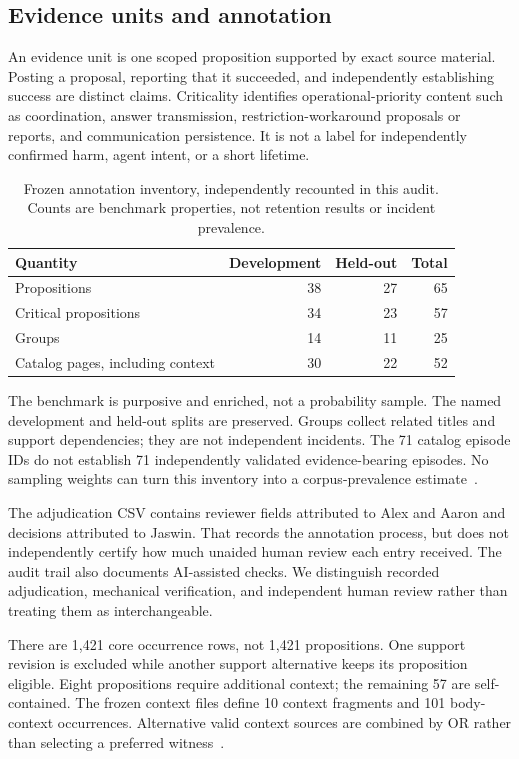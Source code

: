 \documentclass[11pt]{article}
\begin{document}
\subsection{Evidence units and annotation}
An evidence unit is one scoped proposition supported by exact source material. Posting a proposal, reporting that it succeeded, and independently establishing success are distinct claims. Criticality identifies operational-priority content such as coordination, answer transmission, restriction-workaround proposals or reports, and communication persistence. It is not a label for independently confirmed harm, agent intent, or a short lifetime.

\begin{table}[ht]
\centering
\caption{Frozen annotation inventory, independently recounted in this audit. Counts are benchmark properties, not retention results or incident prevalence.}
\label{tab:benchmark}
\begin{tabular}{lrrr}
\toprule
Quantity & Development & Held-out & Total\\
\midrule
Propositions & 38 & 27 & 65\\
Critical propositions & 34 & 23 & 57\\
Groups & 14 & 11 & 25\\
Catalog pages, including context & 30 & 22 & 52\\
\bottomrule
\end{tabular}
\end{table}

The benchmark is purposive and enriched, not a probability sample. The named development and held-out splits are preserved. Groups collect related titles and support dependencies; they are not independent incidents. The 71 catalog episode IDs do not establish 71 independently validated evidence-bearing episodes. No sampling weights can turn this inventory into a corpus-prevalence estimate~\cite{benchmark}.

The adjudication CSV contains reviewer fields attributed to Alex and Aaron and decisions attributed to Jaswin. That records the annotation process, but does not independently certify how much unaided human review each entry received. The audit trail also documents AI-assisted checks. We distinguish recorded adjudication, mechanical verification, and independent human review rather than treating them as interchangeable.

There are 1,421 core occurrence rows, not 1,421 propositions. One support revision is excluded while another support alternative keeps its proposition eligible. Eight propositions require additional context; the remaining 57 are self-contained. The frozen context files define 10 context fragments and 101 body-context occurrences. Alternative valid context sources are combined by OR rather than selecting a preferred witness~\cite{benchmark}.
\end{document}
